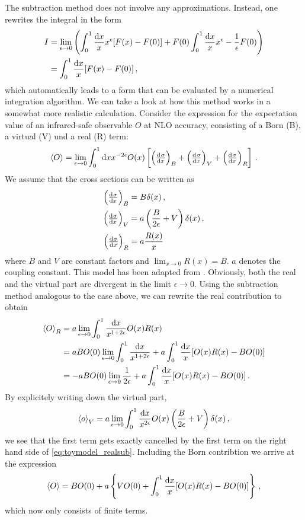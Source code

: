 The subtraction method does not involve any approximations.
Instead, one rewrites the integral in the form
%
\begin{align}
	I	&= \lim_{\epsilon \rightarrow 0} \left( \int_0^1 \frac{\dif x}{x} x^\epsilon [F(x) - F(0)] + F(0) \int_0^1 \frac{\dif x}{x} x^\epsilon - \frac{1}{\epsilon} F(0) \right) \nonumber \\
		&= \int_0^1 \frac{\dif x}{x} [F(x) - F(0)] \, ,
\end{align}
%
which automatically leads to a form that can be evaluated by a numerical integration algorithm.
We can take a look at how this method works in a somewhat more realistic calculation.
Consider the expression for the expectation value of an infrared-safe observable $O$ at NLO accuracy, consisting of a Born (B), a virtual (V) und a real (R) term:
%
\begin{equation}
	\left< O \right> = \lim_{\epsilon \rightarrow 0} \int_0^1 \dif x x^{-2 \epsilon} O(x) \left[ \left( \od{\sigma}{x} \right)_B + \left( \od{\sigma}{x} \right)_V + \left( \od{\sigma}{x} \right)_R \right] \, .
\end{equation}
%
We assume that the cross sections can be written as
%
\begin{align}
	\left( \od{\sigma}{x} \right)_B &= B \delta(x) \, , \\
	\left( \od{\sigma}{x} \right)_V &= a \left( \frac{B}{2 \epsilon} + V \right) \delta(x) \, , \\
	\left( \od{\sigma}{x} \right)_R &= a \frac{R(x)}{x} \,
\end{align}
%
where $B$ and $V$ are constant factors and $\lim_{x \rightarrow 0} R(x) = B$.
$a$ denotes the coupling constant.
This model has been adapted from \cite{mcatnlo}.
Obviously, both the real and the virtual part are divergent in the limit $\epsilon \rightarrow 0$.
Using the subtraction method analogous to the case above, we can rewrite the real contribution to obtain
%
\begin{align}
	\left< O \right>_R	&= a \lim_{\epsilon \rightarrow 0} \int_0^1 \frac{\dif x}{x^{1+2 \epsilon}} O(x) R(x) \nonumber \\
						&= a B O(0) \lim_{\epsilon \rightarrow 0} \int_0^1 \frac{\dif x}{x^{1+2 \epsilon}} + a \int_0^1 \frac{\dif x}{x} [O(x) R(x) - B O(0)] \nonumber \\
						&= -a B O(0) \lim_{\epsilon \rightarrow 0} \frac{1}{2 \epsilon} + a \int_0^1 \frac{\dif x}{x} [O(x) R(x) - B O(0)] \, .
	\label{eq:toymodel_realsub}
\end{align}
%
By explicitely writing down the virtual part,
%
\begin{equation}
	\left< o \right>_V = a \lim_{\epsilon \rightarrow 0} \int_0^1 \frac{\dif x}{x^{2 \epsilon}} O(x) \left( \frac{B}{2 \epsilon} + V \right) \delta(x) \, ,
\end{equation}
%
we see that the first term gets exactly cancelled by the first term on the right hand side of \eqref{eq:toymodel_realsub}.
Including the Born contribtion we arrive at the expression
%
\begin{equation}
	\left< O \right> = B O(0) + a \left\{ V O(0) + \int_0^1 \frac{\dif x}{x} [O(x) R(x) - B O(0)] \right\} \, ,
\end{equation}
%
which now only consists of finite terms.

